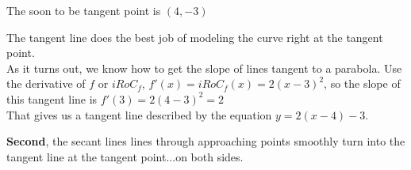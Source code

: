 \documentclass{ximera}
\begin{document}
The soon to be tangent point is $(4, -3)$ \\







\begin{image}
\end{image}



The tangent line does the best job of modeling the curve right at the tangent point. \\


As it turns out, we know how to get the slope of lines tangent to a parabola.  Use the derivative of $f$ or $iRoC_f$,  $f'(x)=iRoC_f(x) = 2 (x-3)^2$, so the slope of this tangent line is $f'(3) = 2 (4-3)^2 = 2$ \\

That gives us a tangent line described by the equation $y = 2 (x - 4) - 3$.











\textbf{Second}, the secant lines lines through approaching points smoothly turn into the tangent line at the tangent point...on both sides.
\end{document}
